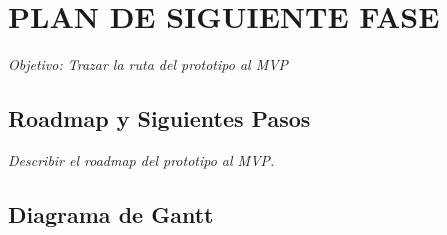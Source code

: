 \chapter{PLAN DE SIGUIENTE FASE}

\noindent \textit{Objetivo:  Trazar la ruta del prototipo al MVP }

\section{Roadmap y Siguientes Pasos}
\noindent \textit{Describir el roadmap del prototipo al MVP.}

\section{Diagrama de Gantt}
